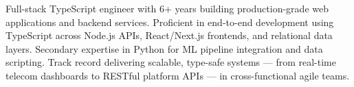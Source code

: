 
\begin{cvparagraph}
  Full-stack TypeScript engineer with 6+ years building production-grade web applications and backend services. Proficient in end-to-end development using TypeScript across Node.js APIs, React/Next.js frontends, and relational data layers. Secondary expertise in Python for ML pipeline integration and data scripting. Track record delivering scalable, type-safe systems — from real-time telecom dashboards to RESTful platform APIs — in cross-functional agile teams.
\end{cvparagraph}
